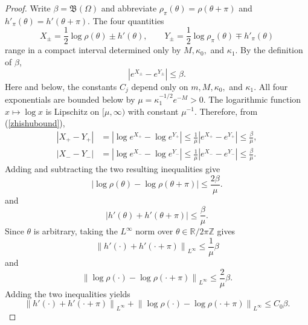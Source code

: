 \documentclass[10pt,a4paper]{amsart}
\begin{document}
\begin{proof}
Write $\beta=\mathfrak B(\Omega)$ and abbreviate
$\rho_\pi(\theta)=\rho(\theta+\pi)$ and
$h'_\pi(\theta)=h'(\theta+\pi)$. The four quantities
\[
 X_\pm=\frac12\log\rho(\theta)\pm h'(\theta),
 \qquad
 Y_\pm=\frac12\log\rho_\pi(\theta)\mp h'_\pi(\theta)
\]
range in a compact interval determined only by
$M,\kappa_0,$ and $\kappa_1$. By the definition of $\beta$,
\begin{equation}\label{zhishubound}
 \left|e^{X_\pm}-e^{Y_\pm}\right|\leq\beta.
\end{equation}
Here and below, the constants $C_j$ depend only on
$m,M,\kappa_0,$ and $\kappa_1$.
All four exponentials are bounded below by
$\mu=\kappa_1^{-1/2}e^{-M}>0$.
The logarithmic function $x \mapsto \log x$ is Lipschitz on $[\mu, \infty)$ with constant $\mu^{-1}$.
Therefore, from (\ref{zhishubound}),
\begin{align*}
\left|X_+ - Y_+\right|
&= \left| \log e^{X_+} - \log e^{Y_+} \right|
\le \frac{1}{\mu} \left|e^{X_+} - e^{Y_+}\right|
\le \frac{\beta}{\mu}, \\
\left|X_- - Y_-\right|
&= \left| \log e^{X_-} - \log e^{Y_-} \right|
\le \frac{1}{\mu} \left|e^{X_-} - e^{Y_-}\right|
\le \frac{\beta}{\mu}.
\end{align*}
Adding and subtracting the two resulting inequalities give
\[
\left| \log \rho(\theta) - \log \rho(\theta+\pi) \right| \le \frac{2\beta}{\mu}.
\]
and
\[
\left| h'(\theta) + h'(\theta+\pi) \right| \le \frac{\beta}{\mu}.
\]
Since $\theta$ is arbitrary, taking the $L^\infty$ norm over $\theta \in \mathbb{R}/2\pi\mathbb{Z}$ gives
\[
\left\| h'(\cdot) + h'(\cdot+\pi)\right\|_{L^\infty} \le \frac{1}{\mu}\beta
\]
and
\[
\left\| \log \rho(\cdot) - \log \rho(\cdot+\pi)\right\|_{L^\infty} \le \frac{2}{\mu}\beta.
\]
Adding the two inequalities yields
\begin{equation}\label{eq:log-defect-control}
 \left\|h'(\cdot)+h'(\cdot+\pi)\right\|_{L^\infty}
 +\left\|\log\rho(\cdot)-\log\rho(\cdot+\pi)\right\|_{L^\infty}
 \leq C_0\beta.
\end{equation}


\end{proof}
\end{document}
